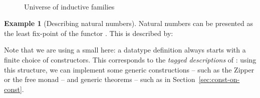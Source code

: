 \documentclass{scrartcl}
\theoremstyle{plain}
\theoremstyle{definition}
\newtheorem{example}{Example}
\begin{document}
\renewcommand{\InterpretIDescDef}{
\Code{
  \Let{\InterpretIDesc{\PiTel{\Var{D}}{\IDesc[\Var{I}]}} & 
              \PiTel{\Var{X}}{\Var{I} \To \Set}}
      {\Set}{}\\
\Case{
\Return{\InterpretIDesc{\DVar[\Var{i}]} & \Var{X}}{\Var{X}\: \Var{i}}
\Return{\InterpretIDesc{\DUnit} & \Var{X}}{\Unit}
\Return{\InterpretIDesc{\Var{A} \DTimes \Var{B}} & \Var{X}}
       {\InterpretIDesc{\Var{A}}[\Var{X}] \Times \InterpretIDesc{\Var{B}}[\Var{X}]}
\Return{\InterpretIDesc{\DPi[\Var{S}\: \Var{T}]} & \Var{X}}{\PiTo{\Var{s}}{\Var{S}}{\InterpretIDesc{\Var{T}\: \Var{s}}[\Var{X}]}}
\Return{\InterpretIDesc{\DSigma[\Var{S}\: \Var{T}]} & \Var{X}}{\SigmaTimes{\Var{s}}{\Var{S}}{\InterpretIDesc{\Var{T}\: \Var{s}}[\Var{X}]}}
\Return{\InterpretIDesc{\Dsigma[\Var{E}\: \Var{T}]} & \Var{X}}
       {\SigmaTimes{\Var{e}}{\EnumT[\Var{E}]}
                   {\InterpretIDesc{\Var{T}\: \Var{e}}[\Var{X}]}}
}}}


\begin{figure}[tbp]

\centering
\subfloat[][Codes]{\small }
\qquad
{}
\\

\caption{Universe of inductive families}
\label{fig:universe-families}

\end{figure}





\begin{example}[Describing natural numbers]

\renewcommand{\NatDDef}{
  \Let{\NatD}{\IDesc[\Unit]}{
    \Return{\NatD}
           {\Dsigma[\Collection{
                        \begin{array}{l}
                          \Tag{0},\\ 
                          \Tag{\CN{suc}}
                        \end{array}}\:
                    \CollectionElim{
                      \begin{array}{l@{\DoReturn}l}
                        \Tag{0} & \DUnit, \\
                        \Tag{\CN{suc}} & \DVar[\Void]
                      \end{array}
                    }]}}
}


Natural numbers can be presented as the least fix-point of the
functor . This is described by:

Note that we are using a small  here: a datatype definition
always starts with a finite choice of constructors. This corresponds
to the \emph{tagged descriptions} of \citet{dagand:levitation}: using
this structure, we can implement some generic constructions -- such as
the Zipper or the free monad -- and generic theorems -- such as in
Section~\ref{sec:const-on-const}.

\end{example}
\end{document}
